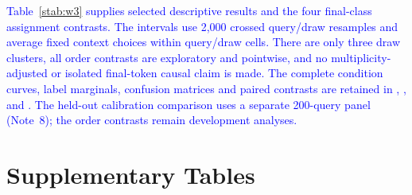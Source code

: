 \documentclass[11pt]{article}
\begin{document}
\textcolor{blue}{Table~\ref{stab:w3} supplies selected descriptive results and the four final-class assignment contrasts. The intervals use 2,000 crossed query/draw resamples and average fixed context choices within query/draw cells. There are only three draw clusters, all order contrasts are exploratory and pointwise, and no multiplicity-adjusted or isolated final-token causal claim is made. The complete condition curves, label marginals, confusion matrices and paired contrasts are retained in , ,  and . The held-out calibration comparison uses a separate 200-query panel (Note~8); the order contrasts remain development analyses.}



\clearpage


\section*{Supplementary Tables}
\end{document}
